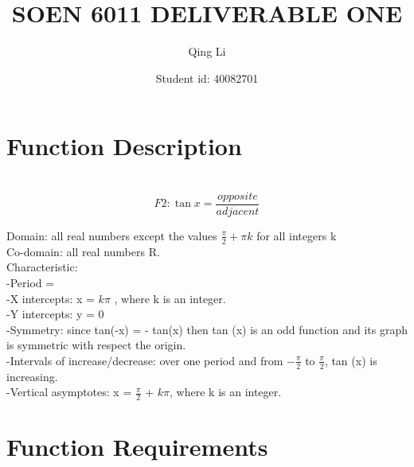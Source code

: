 \documentclass[12pt]{article}
\title{SOEN 6011 DELIVERABLE ONE}
\author{Qing Li}
\date{Student id: 40082701}
\begin{document}
\maketitle


\section{Function Description}\\

 \begin{equation}
    F2:  \tan{x}=\frac{opposite}{adjacent}
  \end{equation}

Domain: all real numbers except the values $ \frac{\pi}{2} + \pi k $ for all integers k \\

Co-domain: all real numbers R.\\

Characteristic:\\

-Period = \pi\\ 

-X intercepts: x = $k\pi$ , where k is an integer.\\ 

-Y intercepts: y = 0 \\

-Symmetry: since tan(-x) = - tan(x) then tan (x) is an odd function and its graph is symmetric with respect the origin. \\

-Intervals of increase/decrease: over one period and from $-\frac{\pi}{2}$ to $\frac{\pi}{2}$, tan (x) is increasing.\\

-Vertical asymptotes: x = $\frac{\pi}{2}$ + $k\pi$, where k is an integer. \\



\section{Function Requirements}\\
\end{document}
